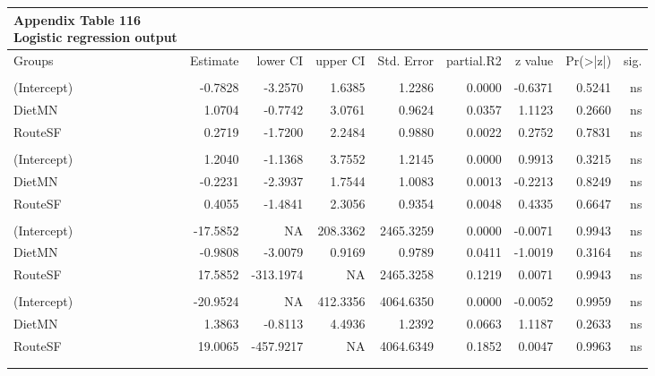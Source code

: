 \documentclass[
  12pt,
  letterpaper,
]{article}
\begin{document}
\begingroup
\fontsize{12.0pt}{14.4pt}\selectfont
\begin{longtable}{l|rrrrrrrr}
\caption*{
{\large \textbf{Appendix Table 116}} \\ 
{\small \textbf{Logistic regression output}}
} \\ 
\toprule
Groups & {Estimate} & {lower CI} & {upper CI} & {Std. Error} & {partial.R2} & {z value} & {Pr(>|z|)} & {sig.} \\ 
\midrule\addlinespace[2.5pt]
\multicolumn{9}{l}{Brain} \\[2.5pt] 
\midrule\addlinespace[2.5pt]
(Intercept) & -0.7828 & -3.2570 & 1.6385 & 1.2286 & 0.0000 & -0.6371 & 0.5241 & ns \\ 
DietMN & 1.0704 & -0.7742 & 3.0761 & 0.9624 & 0.0357 & 1.1123 & 0.2660 & ns \\ 
RouteSF & 0.2719 & -1.7200 & 2.2484 & 0.9880 & 0.0022 & 0.2752 & 0.7831 & ns \\ 
\midrule\addlinespace[2.5pt]
\multicolumn{9}{l}{Ear} \\[2.5pt] 
\midrule\addlinespace[2.5pt]
(Intercept) & 1.2040 & -1.1368 & 3.7552 & 1.2145 & 0.0000 & 0.9913 & 0.3215 & ns \\ 
DietMN & -0.2231 & -2.3937 & 1.7544 & 1.0083 & 0.0013 & -0.2213 & 0.8249 & ns \\ 
RouteSF & 0.4055 & -1.4841 & 2.3056 & 0.9354 & 0.0048 & 0.4335 & 0.6647 & ns \\ 
\midrule\addlinespace[2.5pt]
\multicolumn{9}{l}{Eye} \\[2.5pt] 
\midrule\addlinespace[2.5pt]
(Intercept) & -17.5852 & NA & 208.3362 & 2465.3259 & 0.0000 & -0.0071 & 0.9943 & ns \\ 
DietMN & -0.9808 & -3.0079 & 0.9169 & 0.9789 & 0.0411 & -1.0019 & 0.3164 & ns \\ 
RouteSF & 17.5852 & -313.1974 & NA & 2465.3258 & 0.1219 & 0.0071 & 0.9943 & ns \\ 
\midrule\addlinespace[2.5pt]
\multicolumn{9}{l}{Liver} \\[2.5pt] 
\midrule\addlinespace[2.5pt]
(Intercept) & -20.9524 & NA & 412.3356 & 4064.6350 & 0.0000 & -0.0052 & 0.9959 & ns \\ 
DietMN & 1.3863 & -0.8113 & 4.4936 & 1.2392 & 0.0663 & 1.1187 & 0.2633 & ns \\ 
RouteSF & 19.0065 & -457.9217 & NA & 4064.6349 & 0.1852 & 0.0047 & 0.9963 & ns \\ 
\midrule\addlinespace[2.5pt]
\multicolumn{9}{l}{Paw} \\[2.5pt] 
\midrule\addlinespace[2.5pt]

\end{longtable}
\end{document}
